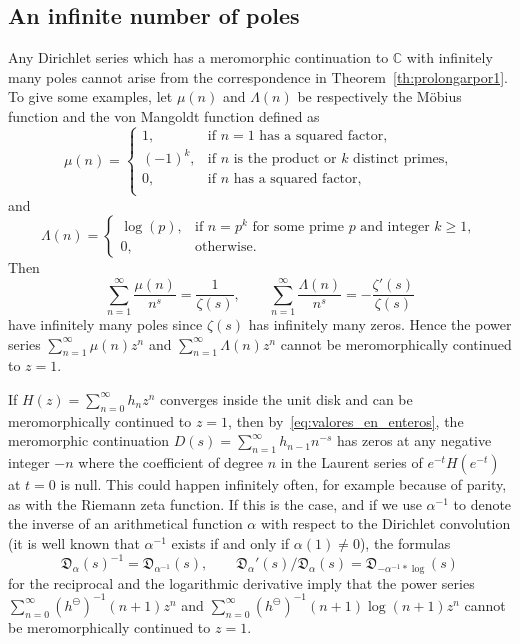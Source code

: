 \documentclass[11pt,a4paper]{amsart}
\newcommand{\C}{\mathbb{C}}
\newcommand{\D}{\mathfrak{D}}
\newcommand{\decr}{\ominus}
\theoremstyle{plain}
\theoremstyle{plain}
\theoremstyle{plain}
\theoremstyle{definition}
\theoremstyle{remark}
\begin{document}
\subsection{An infinite number of poles}
\label{subsec:inf_poles}

Any Dirichlet series which has a meromorphic continuation to $\C$ with infinitely many poles cannot arise from the correspondence in Theorem~\ref{th:prolongarpor1}. 
To give some examples, let $\mu(n)$ and $\Lambda(n)$ be respectively the M\"obius function and the von Mangoldt function defined as
\[
\mu(n) = 
\begin{cases}
  1, & \text{if $n=1$ has a squared factor}, \\
  (-1)^k, & \text{if $n$ is the product or $k$ distinct primes}, \\
  0, & \text{if $n$ has a squared factor}, \\
\end{cases}
\]
and
\[
  \Lambda(n) = 
  \begin{cases}
  \log(p), & \text{if $n=p^k$ for some prime $p$ and integer $k \ge 1$}, \\
  0, & \text{otherwise}.
  \end{cases}
\]
%
Then
\[
  \sum_{n=1}^{\infty} \frac{\mu(n)}{n^{s}} = \frac{1}{\zeta(s)},
  \qquad
  \sum_{n=1}^{\infty} \frac{\Lambda(n)}{n^{s}} = - \frac{\zeta'(s)}{\zeta(s)}
\]
have infinitely many poles since $\zeta(s)$ has infinitely many zeros. Hence the power series $\sum_{n=1}^{\infty} \mu(n) z^{n}$ and $\sum_{n=1}^{\infty} \Lambda(n) z^{n}$ cannot be meromorphically continued to $z = 1$.

If $H(z) = \sum_{n=0}^{\infty} h_{n} z^{n}$ converges inside the unit disk and can be meromorphically continued to $z=1$, then by~\eqref{eq:valores_en_enteros}, the meromorphic continuation $D(s) = \sum_{n=1}^{\infty} h_{n-1} n^{-s}$ has zeros at any negative integer $-n$ where the coefficient of degree $n$ in the Laurent series of $e^{-t} H(e^{-t})$ at $t = 0$ is null. This could happen infinitely often, for example because of parity, as with the Riemann zeta function.
If this is the case, 
and if we use $\alpha^{-1}$ to denote the inverse of an arithmetical function $\alpha$ with respect to the
Dirichlet convolution (it is well known that $\alpha^{-1}$ exists if and only if $\alpha(1) \ne 0$), the formulas
\[
  \D_{\alpha}(s)^{-1} = \D_{\alpha^{-1}}(s),
  \qquad
  \D_{\alpha}'(s)/\D_{\alpha}(s) = \D_{-\alpha^{-1} * \log}(s)
\]
for the reciprocal and the logarithmic derivative imply that the power series $\sum_{n=0}^{\infty} (h^{\decr})^{-1}(n+1) z^{n}$ and $\sum_{n=0}^{\infty} (h^{\decr})^{-1}(n+1) \log(n+1) z^{n}$ cannot be meromorphically continued to $z=1$.
  
\end{document}
